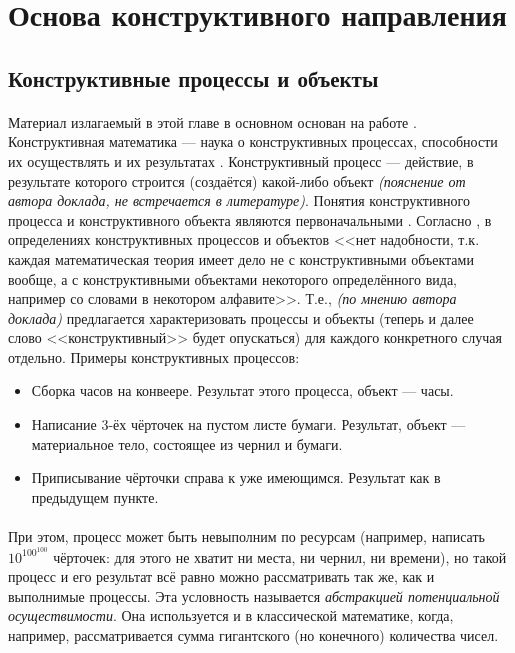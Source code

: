 \documentclass[a4paper,12pt,russian]{article}
\begin{document}
\section{Основа конструктивного направления}
\subsection{Конструктивные процессы и объекты}
\paragraph{}Материал излагаемый в этой главе в основном основан на работе \cite[О логике конструктивной математики]{markov}. Конструктивная математика --- наука о конструктивных процессах, способности их осуществлять и их результатах \cite{markov}. Конструктивный процесс --- действие, в результате которого строится (создаётся) какой-либо объект \emph{(пояснение от автора доклада, не встречается в литературе)}. Понятия конструктивного процесса и конструктивного объекта являются первоначальными \cite{bre}. Согласно \cite{markov}, в определениях конструктивных процессов и объектов <<нет надобности, т.к. каждая математическая теория имеет дело не с конструктивными объектами вообще, а с конструктивными объектами некоторого определённого вида, например со словами в некотором алфавите>>. Т.е., \emph{(по мнению автора доклада)} предлагается характеризовать процессы и объекты (теперь и далее слово <<конструктивный>> будет опускаться) для каждого конкретного случая отдельно.
Примеры конструктивных процессов:
\begin{itemize}
  \item Сборка часов на конвеере. Результат этого процесса, объект --- часы.
  \item Написание 3-ёх чёрточек на пустом листе бумаги. Результат, объект --- материальное тело, состоящее из чернил и бумаги.
  \item Приписывание чёрточки справа к уже имеющимся. Результат как в предыдущем пункте.
\end{itemize}
\paragraph{}При этом, процесс может быть невыполним по ресурсам (например, написать $10^{100^{100}}$ чёрточек: для этого не хватит ни места, ни чернил, ни времени), но такой процесс и его результат всё равно можно рассматривать так же, как и выполнимые процессы. Эта условность называется \emph{абстракцией потенциальной осуществимости}. Она используется и в классической математике, когда, например, рассматривается сумма гигантского (но конечного) количества чисел.
\end{document}
